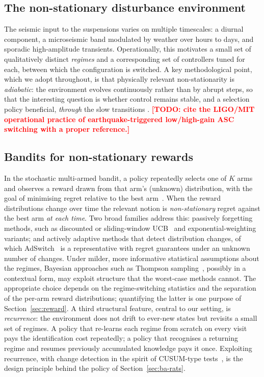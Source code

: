 \documentclass[11pt,a4paper]{article}
\newcommand{\todo}[1]{\textcolor{red}{\textbf{[TODO: #1]}}}
\begin{document}
\subsection{The non-stationary disturbance environment}\label{sec:bg-env}
The seismic input to the suspensions varies on multiple timescales: a diurnal
component, a microseismic band modulated by weather over hours to days, and
sporadic high-amplitude transients. Operationally, this motivates a small set of
qualitatively distinct \emph{regimes} and a corresponding set of controllers
tuned for each, between which the configuration is switched. A key methodological
point, which we adopt throughout, is that physically relevant non-stationarity
is \emph{adiabatic}: the environment evolves continuously rather than by abrupt
steps, so that the interesting question is whether control remains stable, and a
selection policy beneficial, \emph{through} the slow transitions
\cite{Harms_internal}. \todo{cite the LIGO/MIT operational practice of
earthquake-triggered low/high-gain ASC switching with a proper reference.}

\subsection{Bandits for non-stationary rewards}\label{sec:bg-bandit}
In the stochastic multi-armed bandit, a policy repeatedly selects one of $K$
arms and observes a reward drawn from that arm's (unknown) distribution, with
the goal of minimising regret relative to the best arm~\cite{Lattimore}. When
the reward distributions change over time the relevant notion is
\emph{non-stationary} regret against the best arm \emph{at each time}. Two broad
families address this: passively forgetting methods, such as discounted or
sliding-window UCB~\cite{GarivierMoulines} and exponential-weighting variants;
and actively adaptive methods that detect distribution changes, of which
AdSwitch~\cite{AdSwitch} is a representative with regret guarantees under an
unknown number of changes. Under milder, more informative statistical
assumptions about the regimes, Bayesian approaches such as Thompson
sampling~\cite{Thompson,RussoTutorial}, possibly in a contextual form, may
exploit structure that the worst-case methods cannot. The appropriate choice
depends on the regime-switching statistics and the separation of the per-arm
reward distributions; quantifying the latter is one purpose of
Section~\ref{sec:reward}. A third structural feature, central to our setting,
is \emph{recurrence}: the environment does not drift to ever-new states but
revisits a small set of regimes. A policy that re-learns each regime from
scratch on every visit pays the identification cost repeatedly; a policy that
recognises a returning regime and resumes previously accumulated knowledge pays
it once. Exploiting recurrence, with change detection in the spirit of
CUSUM-type tests~\cite{Page}, is the design principle behind the policy of
Section~\ref{sec:ba-rats}.
\end{document}
